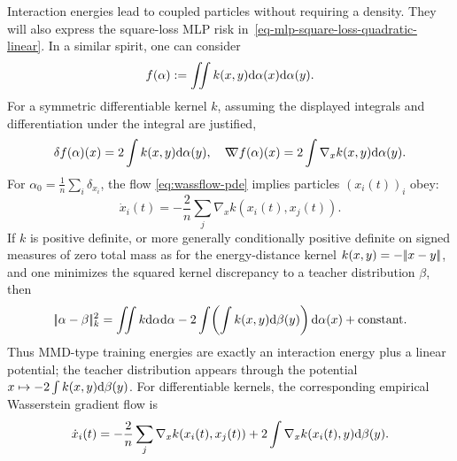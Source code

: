 Interaction energies lead to coupled particles without requiring a density. They will also express the square-loss MLP risk in~\eqref{eq-mlp-square-loss-quadratic-linear}. In a similar spirit, one can consider
   \begin{equation}
       f(\alpha) := \iint k(x, y) \mathrm{d} \alpha(x) \mathrm{d} \alpha(y). \label{eq:quadratic-func}
   \end{equation}
   For a symmetric differentiable kernel $k$, assuming the displayed integrals and differentiation under the integral are justified,
   \begin{equation*}
       \delta f(\alpha)(x) = 2 \int k(x, y) \mathrm{d} \alpha(y), \quad \mathord{\nabla\mkern-9.3mu\nabla} f(\alpha)(x) = 2 \int \nabla_x k(x, y) \mathrm{d} \alpha(y).
   \end{equation*}
   For $\alpha_0 = \frac{1}{n} \sum_i \delta_{x_i}$, the flow \eqref{eq:wassflow-pde} implies particles $(x_i(t))_i$ obey:
   \begin{equation*}
       \dot{x}_i(t) = -\frac{2}{n} \sum_j \nabla_x k(x_i(t), x_j(t)).
   \end{equation*}
	   If $k$ is positive definite, or more generally conditionally positive definite on signed measures of zero total mass as for the energy-distance kernel $k(x,y)=-|\!| x-y |\!|$, and one minimizes the squared kernel discrepancy to a teacher distribution $\beta$, then
   \[
       |\!| \alpha-\beta |\!|_k^2
       =
       \iint k\mathrm{d}\alpha\mathrm{d}\alpha
       -2\int\!\left(\int k(x,y)\mathrm{d}\beta(y)\right)\mathrm{d}\alpha(x)
       +\mathrm{constant}.
       \]
	       Thus MMD-type training energies are exactly an interaction energy plus a linear potential; the teacher distribution appears through the potential $x\mapsto-2\int k(x,y)\mathrm{d}\beta(y)$. For differentiable kernels, the corresponding empirical Wasserstein gradient flow is
       \[
		\dot x_i(t)
		=
		-\frac{2}{n}\sum_j\nabla_x k(x_i(t),x_j(t))
		+
		2\int\nabla_x k(x_i(t),y)\mathrm{d}\beta(y).
       \]



